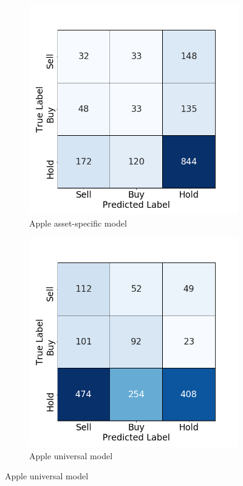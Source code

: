\documentclass[11pt, a4paper]{article}
\begin{document}
\begin{figure}[H]
\begin{subfigure}{.5\textwidth}
  \centering
  \includegraphics[width=.75\linewidth]{images/CMs/CM_indiv_AAPL.png}  
  \caption{Apple asset-specific model}
  \label{fig:subAAPLI}
\end{subfigure}
\begin{subfigure}{.5\textwidth}
  \centering
  \includegraphics[width=.75\linewidth]{images/CMs/CM_univ_AAPL.png}  
  \caption{Apple universal model}
  \label{fig:subAAPLU}
\end{subfigure}


\end{figure}
\end{document}
